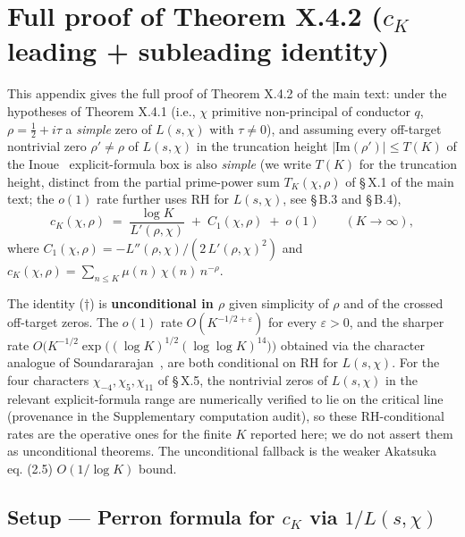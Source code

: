 \section{Full proof of Theorem X.4.2 ($c_K$ leading + subleading identity)}

This appendix gives the full proof of Theorem X.4.2 of the main text:
under the hypotheses of Theorem X.4.1 (i.e., \(\chi\) primitive
non-principal of conductor \(q\), \(\rho = \tfrac12 + i\tau\) a \emph{simple}
zero of \(L(s,\chi)\) with \(\tau \ne 0\)), and assuming every
off-target nontrivial zero \(\rho' \ne \rho\) of \(L(s,\chi)\) in the
truncation height \(|\mathrm{Im}(\rho')| \le T(K)\) of the Inoue~\cite{Inoue2021}
explicit-formula box is also \emph{simple} (we write \(T(K)\) for the
truncation height, distinct from the partial prime-power sum
\(T_K(\chi,\rho)\) of \S\,X.1 of the main text; the \(o(1)\) rate further
uses RH for \(L(s,\chi)\), see \S\,B.3 and \S\,B.4),
\begin{equation}
\label{eq:cK-appendix}
c_K(\chi,\rho) \;=\; \frac{\log K}{L'(\rho,\chi)} \;+\; C_1(\chi,\rho) \;+\; o(1)
\qquad (K \to \infty),
\tag{$\dagger$}
\end{equation}
where \(C_1(\chi,\rho) = -L''(\rho,\chi) / (2\,L'(\rho,\chi)^2)\) and
\(c_K(\chi,\rho) = \sum_{n \le K} \mu(n)\,\chi(n)\,n^{-\rho}\).

The identity (\(\dagger\)) is \textbf{unconditional in \(\rho\)} given
simplicity of \(\rho\) and of the crossed off-target zeros. The \(o(1)\) rate
\(O(K^{-1/2 + \varepsilon})\) for every \(\varepsilon > 0\), and the
sharper rate
\(O\bigl(K^{-1/2} \exp\bigl((\log K)^{1/2}(\log\log K)^{14}\bigr)\bigr)\)
obtained via the character analogue of Soundararajan~\cite[Theorem~1]{Soundararajan2009},
are both conditional on RH for \(L(s, \chi)\). For the four characters
\(\chi_{-4}, \chi_5, \chi_{11}\) of \S\,X.5, the nontrivial zeros of
\(L(s,\chi)\) in the relevant explicit-formula range are numerically
verified to lie on the critical line (provenance in the Supplementary
computation audit), so these RH-conditional rates are the operative
ones for the finite \(K\) reported here; we do not assert them as
unconditional theorems. The unconditional fallback is the weaker
Akatsuka~\cite{Akatsuka2017EulerProduct} eq. (2.5) \(O(1/\log K)\) bound.

\subsection{Setup --- Perron formula for \(c_K\) via \(1/L(s, \chi)\)}

